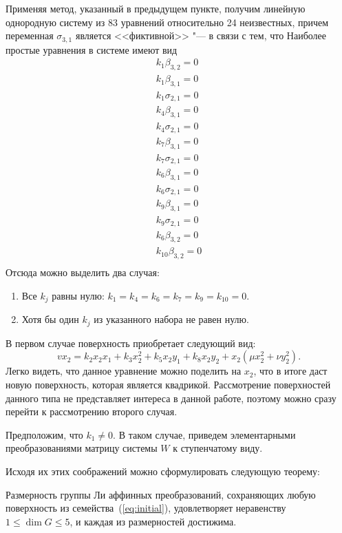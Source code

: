 \documentclass[../main.tex]{subfiles}
\begin{document}
Применяя метод, указанный в предыдущем пункте, получим линейную однородную систему из 83 уравнений относительно 24 неизвестных, причем переменная $\sigma_{3,1}$ является <<фиктивной>> "--- в связи с тем, что   Наиболее простые уравнения в системе имеют вид
\begin{equation}
\begin{array}{l}
 k_1 \beta _{3,2}=0 \\
 k_1 \beta _{3,1}=0 \\
 k_1 \sigma _{2,1}=0 \\
 k_4 \beta _{3,1}=0 \\
 k_4 \sigma _{2,1}=0 \\
 k_7 \beta _{3,1}=0 \\
 k_7 \sigma _{2,1}=0 \\
 k_6 \beta _{3,1}=0 \\
 k_6 \sigma _{2,1}=0 \\
 k_9 \beta _{3,1}=0 \\
 k_9 \sigma _{2,1}=0 \\
 k_6 \beta _{3,2}=0 \\
 k_{10} \beta _{3,2}=0 \\
\end{array}
\end{equation}
Отсюда можно выделить два случая:
\begin{enumerate}
	\item Все $k_j$ равны нулю: $k_1 = k_4 = k_6 = k_7 = k_9 = k_{10} = 0$.
	\item Хотя бы один $k_j$ из указанного набора не равен нулю.
\end{enumerate}
В первом случае поверхность приобретает следующий вид:
\begin{equation*}
v x_2 = k_2 x_2 x_1 + k_3 x_2^2 + k_5 x_2 y_1 + k_8 x_2 y_2 + x_2 (\mu x_2^2 + \nu y_2^2).
\end{equation*}
Легко видеть, что данное уравнение можно поделить на $x_2$, что в итоге даст новую поверхность, которая является квадрикой. Рассмотрение поверхностей данного типа не представляет интереса в данной работе, поэтому можно сразу перейти к рассмотрению второго случая.

Предположим, что $k_1 \ne 0 $. В таком случае, приведем элементарными преобразованиями матрицу системы $W$ к ступенчатому виду. 

Исходя их этих соображений можно сформулировать следующую теорему: 
\begin{theorem} Размерность группы Ли аффинных преобразований, сохраняющих любую поверхность из семейства~(\ref{eq:initial}), удовлетворяет неравенству $1 \le \dim G \le 5$, и каждая из размерностей достижима.
\end{theorem}
\end{document}
